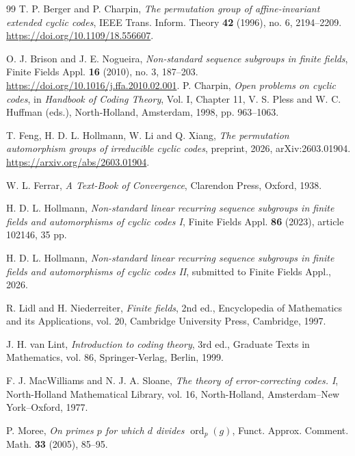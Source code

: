 \documentclass[11pt]{article}
\DeclareMathOperator{\ord}{ord}
\begin{document}
\begin{thebibliography}{99}
%
T. P. Berger and P. Charpin, \emph{The permutation group of
affine-invariant extended cyclic codes}, IEEE Trans. Inform. Theory
\textbf{42} (1996), no. 6, 2194--2209.
\url{https://doi.org/10.1109/18.556607}.
%

O. J. Brison and J. E. Nogueira, \emph{Non-standard sequence subgroups
in finite fields}, Finite Fields Appl. \textbf{16} (2010), no. 3,
187--203. \url{https://doi.org/10.1016/j.ffa.2010.02.001}.
%
P. Charpin, \emph{Open problems on cyclic codes}, in
\emph{Handbook of Coding Theory}, Vol. I, Chapter 11,
V. S. Pless and W. C. Huffman (eds.), North-Holland, Amsterdam,
1998, pp. 963--1063.

T. Feng, H. D. L. Hollmann, W. Li and Q. Xiang,
\emph{The permutation automorphism groups of irreducible cyclic codes},
preprint, 2026, arXiv:2603.01904.
\url{https://arxiv.org/abs/2603.01904}.

W. L. Ferrar,
\emph{A Text-Book of Convergence},
Clarendon Press, Oxford, 1938.

H. D. L. Hollmann, \emph{Non-standard linear recurring sequence
subgroups in finite fields and automorphisms of cyclic codes I},
Finite Fields Appl. \textbf{86} (2023), article 102146, 35 pp.

H. D. L. Hollmann, \emph{Non-standard linear recurring sequence
subgroups in finite fields and automorphisms of cyclic codes II},
submitted to Finite Fields Appl., 2026.

R. Lidl and H. Niederreiter, \emph{Finite fields}, 2nd ed.,
Encyclopedia of Mathematics and its Applications, vol. 20,
Cambridge University Press, Cambridge, 1997.


J. H. van Lint, \emph{Introduction to coding theory}, 3rd ed.,
Graduate Texts in Mathematics, vol. 86, Springer-Verlag, Berlin, 1999.


F. J. MacWilliams and N. J. A. Sloane,
\emph{The theory of error-correcting codes. I},
North-Holland Mathematical Library, vol. 16,
North-Holland, Amsterdam--New York--Oxford, 1977.

P. Moree, \emph{On primes $p$ for which $d$ divides $\ord_p(g)$},
Funct. Approx. Comment. Math. \textbf{33} (2005), 85--95.



\end{thebibliography}
\end{document}

